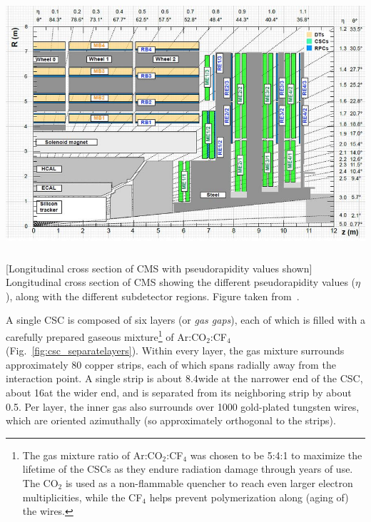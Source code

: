 \begin{multiFigure}
    \centering
    \includegraphics[width=15cm,height=10cm,keepaspectratio]{figures/cms/cms_longitudinal_view.png}
        [Longitudinal cross section of CMS with pseudorapidity values shown]
        {Longitudinal cross section of CMS showing the different pseudorapidity values ($\eta$), along with the different subdetector regions.
        Figure taken from~\cite{PhysRevLett.114.191803}. %
        }
    \label{fig:cms_long_view_subdetectors}
\end{multiFigure}
A single CSC is composed of six layers (or \emph{gas gaps}), each of which is filled with a carefully prepared gaseous mixture\footnote{
    The gas mixture ratio of Ar:CO$_{2}$:CF$_{4}$ was chosen to be 5:4:1 to maximize the lifetime of the CSCs as they endure radiation damage through years of use.
    The CO$_{2}$ is used as a non-flammable quencher to reach even larger electron multiplicities, while the CF$_{4}$ helps prevent polymerization along (aging of) the wires.
    }
of Ar:CO$_{2}$:CF$_{4}$ (Fig.~\ref{fig:csc_separatelayers}).
Within every layer, the gas mixture surrounds approximately 80 copper strips, each of which spans radially away from the interaction point.
A single strip is about 8.4\mm wide at the narrower end of the CSC, about 16\mm at the wider end, and is separated from its neighboring strip by about 0.5\mm.
Per layer, the inner gas also surrounds over 1000 gold-plated tungsten wires, which are oriented azimuthally (so approximately orthogonal to the strips).
